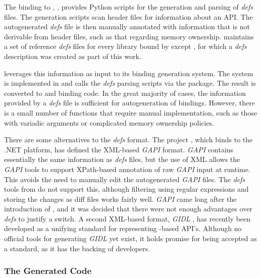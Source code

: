 \documentclass[article]{jss}
\begin{document}
The  binding to ,
 \citep{PyGTK}, provides Python scripts for the generation and 
parsing of \emph{defs} files. The generation scripts scan  header 
files for information about an API. The autogenerated \emph{defs} file is then 
manually annotated with information that is not derivable from header files, such as that
regarding memory ownership.  maintains a set of reference \emph{defs} files
for every library bound by  except , for which a \emph{defs}
description was created as part of this work.

 leverages this information as input to its binding generation system.
The system is implemented in  and calls the  \emph{defs}
parsing scripts via the  \citep{RSPython} package.
The result is converted to  and  binding code. In the 
great majority of cases, the information
provided by a \emph{defs} file is sufficient for autogeneration of bindings. 
However, there is a small number of functions that require manual implementation,
such as those with variadic arguments or complicated memory ownership policies.

There are some alternatives to the \emph{defs} format. The  project 
\citep{gtksharp}, which binds  to the .NET platform, has defined
the XML-based \emph{GAPI} format. \emph{GAPI} contains essentially
the same information as \emph{defs} files, but the use of XML allows the 
\emph{GAPI} tools to support XPath-based annotation of raw \emph{GAPI} input
at runtime. This avoids the need to manually edit the autogenerated \emph{GAPI} 
files. The \emph{defs} tools from  do not support this, although
filtering using regular expressions and storing the changes as diff files
works fairly well. \emph{GAPI} came long after the introduction of , and it
was decided that there were not enough advantages over \emph{defs} to 
justify a switch. A second XML-based format, \emph{GIDL} \citep{gidl}, has
recently been developed as a unifying standard for representing -based
API's. Although no official tools for generating \emph{GIDL} yet exist, it holds
promise for being accepted as a standard, as it has the backing of  developers.

\subsubsection{The Generated Code}
\end{document}
